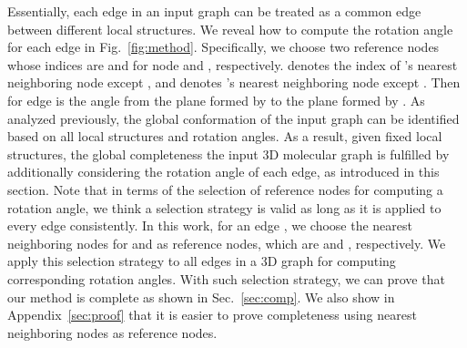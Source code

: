 \documentclass{article}
\begin{document}
Essentially, each edge in an input graph can be treated as a common edge between different local structures.
We reveal how to compute the rotation angle  for each edge  in Fig.~\ref{fig:method}.
Specifically, we choose two reference nodes whose indices are  and  for node  and , respectively.
 denotes the index of 's nearest neighboring node except , and  denotes 's nearest neighboring node except .
Then  for edge  is the angle from the plane formed by  to the plane formed by .
As analyzed previously, the global conformation of the input graph can be identified based on all local structures and rotation angles.
As a result, given fixed local structures, 
the global completeness the input 3D molecular graph is fulfilled by additionally considering the rotation angle of each edge, as introduced in this section.
\textcolor{COLOR}{Note that in terms of the selection of reference nodes for computing a rotation angle, we think a selection strategy is valid as long as it is applied to every edge consistently. In this work, for an edge , we choose the nearest neighboring nodes for  and  as reference nodes, which are  and , respectively. We apply this selection strategy to all edges in a 3D graph for computing corresponding rotation angles.
With such selection strategy, we can prove that our method is complete as shown in Sec.~\ref{sec:comp}.
We also show in Appendix~\ref{sec:proof} that it is easier to prove completeness using nearest neighboring nodes as reference nodes.
}
\end{document}
